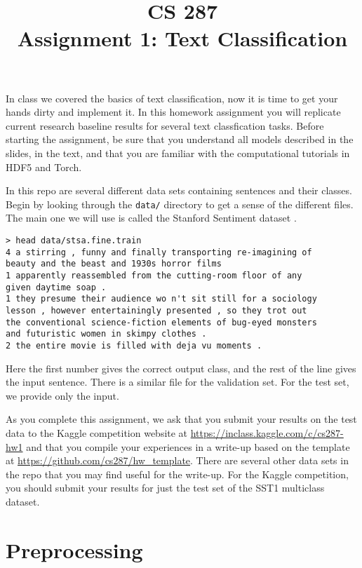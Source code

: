 \documentclass[11pt]{article}
\title{CS 287 \\ Assignment 1: Text Classification }
\date{}
\begin{document}
\maketitle{}

In class we covered the basics of text classification, now it is time
to get your hands dirty and implement it.  In this homework assignment
you will replicate current research baseline results for several text
classfication tasks. Before starting the assignment, be sure that you
understand all models described in the slides, in the text, and that
you are familiar with the computational tutorials in HDF5 and Torch.


In this repo are several different data sets containing sentences and 
their classes. Begin by looking through the \texttt{data/} directory 
to get a sense of the different files. The main one we will use is 
called the Stanford Sentiment dataset \citep{socher2013recursive}.


\begin{verbatim}
> head data/stsa.fine.train
4 a stirring , funny and finally transporting re-imagining of 
beauty and the beast and 1930s horror films
1 apparently reassembled from the cutting-room floor of any 
given daytime soap .
1 they presume their audience wo n't sit still for a sociology 
lesson , however entertainingly presented , so they trot out 
the conventional science-fiction elements of bug-eyed monsters 
and futuristic women in skimpy clothes .
2 the entire movie is filled with deja vu moments .
\end{verbatim}

Here the first number gives the correct output class, and the rest of
the line gives the input sentence. There is a similar file for the
validation set. For the test set, we provide only the input. 

As you complete this assignment, we ask that you submit your results
on the test data to the Kaggle competition website at
\url{https://inclass.kaggle.com/c/cs287-hw1} and that you compile your
experiences in a write-up based on the template at
\url{https://github.com/cs287/hw_template}. There are 
several other data sets in the repo that you may find useful for the 
write-up. For the Kaggle competition, you should submit your results 
for just the test set of the SST1 multiclass dataset.
 
\section{Preprocessing}
\end{document}
